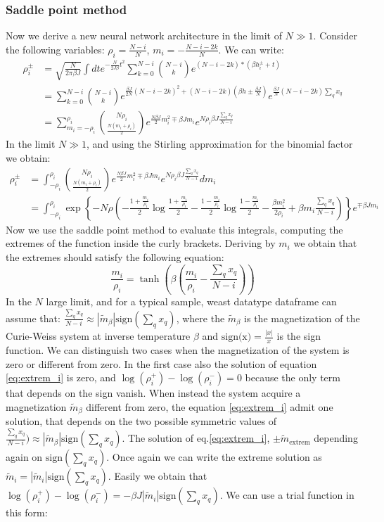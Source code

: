 \documentclass{article}
\begin{document}
\subsubsection{Saddle point method}
Now we derive a new neural network architecture in the limit of $N \gg 1$. Consider the following variables: $\rho_i = \frac{N-i}{N}$, $m_i = -\frac{N-i-2k}{N}$. We can write:
 \begin{align*}
 \rho_i^{\pm} &= \sqrt{\frac{N}{2\pi \beta J}}\int dt e^{-\frac{N}{2J \beta}t^{2}} 
 \sum_{k=0}^{N-i} \binom{N-i}{k} e^{(N-i-2k)*(\beta h_i^{\pm} + t)}\\
 &= \sum_{k=0}^{N-i} \binom{N-i}{k}e^{\frac{\beta J}{2N}\left(N-i-2k\right)^{2}+\left(N-i-2k\right)\left(\beta h\pm\frac{\beta J}{N}\right)} e^{\frac{\beta J}{N}\left(N-i-2k\right) \sum_q x_q} \\
 &= \sum_{m_i=-\rho_i}^{\rho_i} \binom{N\rho_i}{\frac{N(m_i+\rho_i)}{2}} e^{\frac{N \beta J}{2}m_i^{2} \mp \beta J m_i } e^{N \rho_i \beta J \frac{\sum_q x_q}{N-i}}
\end{align*}
In the limit $N \gg 1$, and using the Stirling approximation for the binomial factor we obtain:
 \begin{align*}
 \rho_i^{\pm} &= 
  \int_{-\rho_i}^{\rho_i} \binom{N\rho_i}{\frac{N(m_i+\rho_i)}{2}} e^{\frac{N \beta J}{2}m_i^{2} \mp \beta J m_i } e^{N \rho_i \beta J \frac{\sum_q x_q}{N-i}} dm_i \\
& =  \int_{-\rho_i}^{\rho_i} \exp\left\{-N\rho\left( -\frac{1+\frac{m_i}{\rho_i}}{2} \log\frac{1+\frac{m_i}{\rho_i}}{2} - \frac{1-\frac{m_i}{\rho_i}}{2} \log\frac{1-\frac{m_i}{\rho_i}}{2}   - \frac{\beta m_i^2}{2 \rho_i} + \beta m_i \frac{\sum_q x_q}{N-i}\right) \right\} e^{\mp \beta J m_i}
\end{align*}
Now we use the saddle point method to evaluate this integrals, computing the extremes of the function inside the curly brackets. Deriving by $m_i$ we obtain that the extremes should satisfy the following equation:
\[
\frac{m_i}{\rho_i} = \tanh \left( \beta(\frac{m_i}{\rho_i} - \frac{\sum_q x_q}{N-i}) \right)
\label{eq:extrem_i}
\]
In the $N$ large limit, and for a typical sample, weast datatype dataframe
can assume that: $\frac{\sum_q x_q}{N-i} \approx |\tilde{m}_{\beta}| \text{sign}(\sum_q x_q)$, where the $\tilde{m}_{\beta}$ is the magnetization of the Curie-Weiss system at inverse temperature $\beta$ and $\text{sign(x)} = \frac{|x|}{x}$ is the sign function.
We can distinguish two cases when the magnetization of the system is zero or different from zero. In the first case also the solution of equation \ref{eq:extrem_i} is zero, and $\log(\rho_i^{+}) - \log(\rho_i^{-})=0$ because the only term that depends on the sign vanish. When instead the system acquire a magnetization $\tilde{m}_{\beta}$ different from zero, the equation \ref{eq:extrem_i} admit one solution, that depends on the two possible symmetric values of $\frac{\sum_q x_q}{N-i})\approx |\tilde{m}_{\beta}| \text{sign}(\sum_q x_q)$. The solution of eq.\ref{eq:extrem_i}, $\pm \tilde{m}_{\text{extrem}}$ depending again on $\text{sign}(\sum_q x_q)$. Once again we can write the extreme solution as $\tilde{m}_{i}=|\tilde{m}_i| \text{sign}(\sum_q x_q)$. Easily we obtain that $\log(\rho_i^{+}) - \log(\rho_i^{-}) = -\beta J|\tilde{m}_i| \text{sign}(\sum_q x_q)$. We can use a trial function in this form:
\end{document}
